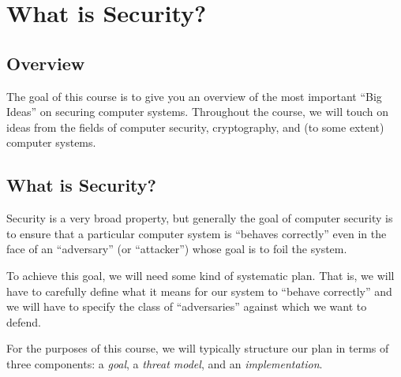 \chapter{What is Security?}

\section{Overview}

The goal of this course is to give you an overview of the 
most important ``Big Ideas'' on securing computer systems.
Throughout the course, we will touch on ideas from the fields
of computer security, cryptography, and (to some extent)
computer systems.

\iffalse
\textbf{Big Idea}: Big ideas for securing computers.
\begin{itemize}
	\item Lectures: ask questions!
	\item Labs (coding) + psets (theory)
	\item Midterm + final
\end{itemize}
\fi

\section{What is Security?}
Security is a very broad property, but generally
the goal of computer security 
is to ensure that a particular computer system is 
``behaves correctly'' even in the
face of an ``adversary'' (or ``attacker'') whose goal is to foil the
system.

To achieve this goal, we will need some kind of
systematic plan.
That is, we will have to carefully define 
what it means for our system to ``behave correctly''
and we will have to specify the class of 
``adversaries'' against which we want to defend.

For the purposes of this course, we will typically
structure our plan in terms of three components:
a \emph{goal}, 
a \emph{threat model}, and
an \emph{implementation}.

